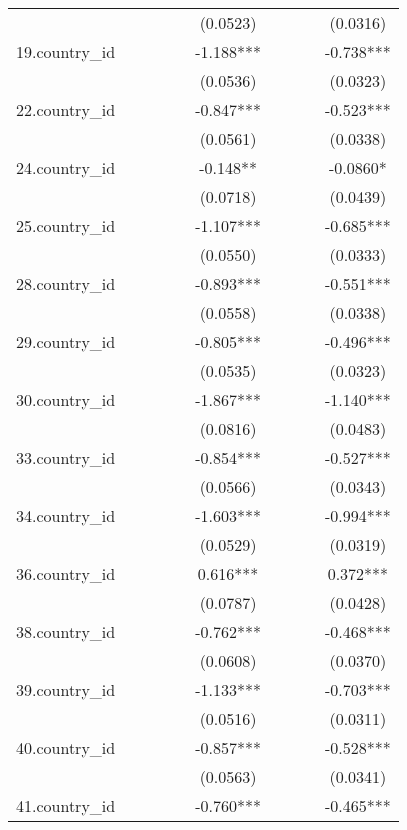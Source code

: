 \documentclass[]{article}
\begin{document}
\begin{tabular}{lccccccccc}
 &  &  &  &  & (0.0523) &  &  &  & (0.0316) \\
19.country\_id &  &  &  &  & -1.188*** &  &  &  & -0.738*** \\
 &  &  &  &  & (0.0536) &  &  &  & (0.0323) \\
22.country\_id &  &  &  &  & -0.847*** &  &  &  & -0.523*** \\
 &  &  &  &  & (0.0561) &  &  &  & (0.0338) \\
24.country\_id &  &  &  &  & -0.148** &  &  &  & -0.0860* \\
 &  &  &  &  & (0.0718) &  &  &  & (0.0439) \\
25.country\_id &  &  &  &  & -1.107*** &  &  &  & -0.685*** \\
 &  &  &  &  & (0.0550) &  &  &  & (0.0333) \\
28.country\_id &  &  &  &  & -0.893*** &  &  &  & -0.551*** \\
 &  &  &  &  & (0.0558) &  &  &  & (0.0338) \\
29.country\_id &  &  &  &  & -0.805*** &  &  &  & -0.496*** \\
 &  &  &  &  & (0.0535) &  &  &  & (0.0323) \\
30.country\_id &  &  &  &  & -1.867*** &  &  &  & -1.140*** \\
 &  &  &  &  & (0.0816) &  &  &  & (0.0483) \\
33.country\_id &  &  &  &  & -0.854*** &  &  &  & -0.527*** \\
 &  &  &  &  & (0.0566) &  &  &  & (0.0343) \\
34.country\_id &  &  &  &  & -1.603*** &  &  &  & -0.994*** \\
 &  &  &  &  & (0.0529) &  &  &  & (0.0319) \\
36.country\_id &  &  &  &  & 0.616*** &  &  &  & 0.372*** \\
 &  &  &  &  & (0.0787) &  &  &  & (0.0428) \\
38.country\_id &  &  &  &  & -0.762*** &  &  &  & -0.468*** \\
 &  &  &  &  & (0.0608) &  &  &  & (0.0370) \\
39.country\_id &  &  &  &  & -1.133*** &  &  &  & -0.703*** \\
 &  &  &  &  & (0.0516) &  &  &  & (0.0311) \\
40.country\_id &  &  &  &  & -0.857*** &  &  &  & -0.528*** \\
 &  &  &  &  & (0.0563) &  &  &  & (0.0341) \\
41.country\_id &  &  &  &  & -0.760*** &  &  &  & -0.465*** \\

\end{tabular}
\end{document}

